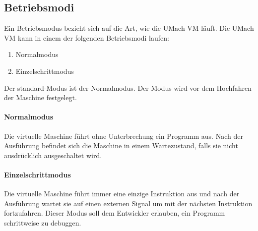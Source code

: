\subsection{Betriebsmodi}
\label{subsec:Betriebsmodi}
Ein \gls{Betriebsmodus} bezieht sich auf die Art, wie die UMach VM läuft.
Die UMach VM kann in einem der folgenden Betriebsmodi laufen:

\begin{enumerate}
  \item Normalmodus
  \item Einzelschrittmodus
\end{enumerate}

Der standard-Modus ist der Normalmodus.
Der Modus wird vor dem Hochfahren der Maschine festgelegt.

\paragraph{Normalmodus} Die virtuelle Maschine führt ohne Unterbrechung ein
Programm aus. Nach der Ausführung befindet sich die Maschine in einem
Wartezustand, falls sie nicht ausdrücklich ausgeschaltet wird.

\paragraph{Einzelschrittmodus} Die virtuelle Maschine führt immer eine einzige
Instruktion aus und nach der Ausführung wartet sie auf einen externen Signal um
mit der nächsten Instruktion fortzufahren. Dieser Modus soll dem Entwickler
erlauben, ein Programm schrittweise zu debuggen.


